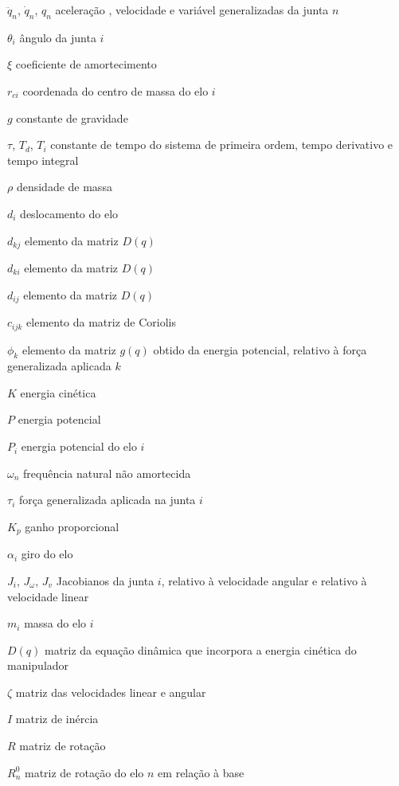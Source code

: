 \begin{simbolos}
	\item[$ \ddot{q}_n $, $\dot{q}_n$, $q_n$] 	aceleração , velocidade e variável generalizadas da junta $n$
	\item[$ \theta_i $] 	ângulo da junta $i$
	\item[$\xi$]		coeficiente de amortecimento
	\item[$ r_{ci} $]	coordenada do centro de massa do elo $i$
	\item[$ g $]		constante de gravidade
	\item[$\tau$, $T_d$, $T_i$]		constante de tempo do sistema de primeira ordem, tempo derivativo e tempo integral
	\item[$ \rho $]		densidade de massa
	\item[$ d_i $]		deslocamento do elo
	\item[$ d_{kj} $]	elemento da matriz $D(q)$
	\item[$ d_{ki} $]	elemento da matriz $D(q)$
	\item[$ d_{ij} $]	elemento da matriz $D(q)$
	\item[$ c_{ijk} $]	elemento da matriz de Coriolis
	\item[$ \phi_k $]	elemento da matriz $g(q)$ obtido da energia potencial, relativo à força generalizada aplicada $k$
	\item[$ K $]		energia cinética
	\item[$ P $]		energia potencial
	\item[$ P_i $]		energia potencial do elo $i$
	\item[$\omega_n$]	frequência natural não amortecida
	\item[$ \tau_i $]	força generalizada aplicada na junta $i$
	\item[$K_p$]		ganho proporcional
	\item[$ \alpha_i $]	giro do elo
	\item[$ J_i$, $J_{\omega}$, $J_v $]		Jacobianos da junta $i$, relativo à velocidade angular e relativo à velocidade linear
	\item[$ m_i $]		massa do elo $i$
	\item[$ D(q) $]		matriz da equação dinâmica que incorpora a energia cinética do manipulador
	\item[$ \zeta $]	matriz das velocidades linear e angular
	\item[$ I $]		matriz de inércia
	\item[$ R $]		matriz de rotação
	\item[$ R_n^0 $]	matriz de rotação do elo $n$ em relação à base

\end{simbolos}
